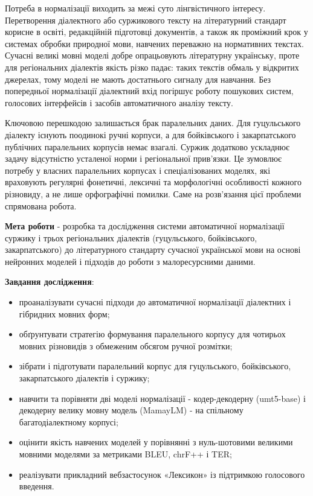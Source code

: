 \documentclass[14pt]{extarticle}
\begin{document}
Потреба в нормалізації виходить за межі суто лінгвістичного інтересу. Перетворення діалектного або суржикового тексту на літературний стандарт корисне в освіті, редакційній підготовці документів, а також як проміжний крок у системах обробки природної мови, навчених переважно на нормативних текстах. Сучасні великі мовні моделі добре опрацьовують літературну українську, проте для регіональних діалектів якість різко падає: таких текстів обмаль у відкритих джерелах, тому моделі не мають достатнього сигналу для навчання. Без попередньої нормалізації діалектний вхід погіршує роботу пошукових систем, голосових інтерфейсів і засобів автоматичного аналізу тексту.

Ключовою перешкодою залишається брак паралельних даних. Для гуцульського діалекту існують поодинокі ручні корпуси, а для бойківського і закарпатського публічних паралельних корпусів немає взагалі. Суржик додатково ускладнює задачу відсутністю усталеної норми і регіональної прив'язки. Це зумовлює потребу у власних паралельних корпусах і спеціалізованих моделях, які враховують регулярні фонетичні, лексичні та морфологічні особливості кожного різновиду, а не лише орфографічні помилки. Саме на розв'язання цієї проблеми спрямована робота.

\textbf{Мета роботи} - розробка та дослідження системи автоматичної нормалізації суржику і трьох регіональних діалектів (гуцульського, бойківського, закарпатського) до літературного стандарту сучасної української мови на основі нейронних моделей і підходів до роботи з малоресурсними даними.

\textbf{Завдання дослідження}:
\begin{itemize}
  \item проаналізувати сучасні підходи до автоматичної нормалізації діалектних і гібридних мовних форм;
  \item обґрунтувати стратегію формування паралельного корпусу для чотирьох мовних різновидів з обмеженим обсягом ручної розмітки;
  \item зібрати і підготувати паралельний корпус для гуцульського, бойківського, закарпатського діалектів і суржику;
  \item навчити та порівняти дві моделі нормалізації - кодер-декодерну (umt5-base) і декодерну велику мовну модель (MamayLM) - на спільному багатодіалектному корпусі;
  \item оцінити якість навчених моделей у порівнянні з нуль-шотовими великими мовними моделями за метриками BLEU, chrF++ і TER;
  \item реалізувати прикладний вебзастосунок «Лексикон» із підтримкою голосового введення.
\end{itemize}
\end{document}
